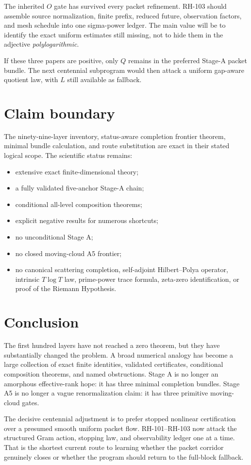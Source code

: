 \documentclass[11pt]{article}
\theoremstyle{definition}
\theoremstyle{remark}
\begin{document}
The inherited $O$ gate has survived every packet refinement.  RH-103 should
assemble source normalization, finite prefix, reduced future, observation
factors, and mesh schedule into one sigma-power ledger.  The main value will
be to identify the exact uniform estimates still missing, not to hide them in
the adjective \emph{polylogarithmic}.

If these three papers are positive, only $Q$ remains in the preferred
Stage-A packet bundle.  The next centennial subprogram would then attack a
uniform gap-aware quotient law, with $L$ still available as fallback.

\section{Claim boundary}

The ninety-nine-layer inventory, status-aware completion frontier theorem,
minimal bundle calculation, and route substitution are exact in their stated
logical scope.  The scientific status remains:
\begin{itemize}[leftmargin=2em]
\item extensive exact finite-dimensional theory;
\item a fully validated five-anchor Stage-A chain;
\item conditional all-level composition theorems;
\item explicit negative results for numerous shortcuts;
\item no unconditional Stage A;
\item no closed moving-cloud A5 frontier;
\item no canonical scattering completion, self-adjoint Hilbert--Polya
operator, intrinsic $T\log T$ law, prime-power trace formula, zeta-zero
identification, or proof of the Riemann Hypothesis.
\end{itemize}

\section{Conclusion}

The first hundred layers have not reached a zero theorem, but they have
substantially changed the problem.  A broad numerical analogy has become a
large collection of exact finite identities, validated certificates,
conditional composition theorems, and named obstructions.  Stage A is no
longer an amorphous effective-rank hope: it has three minimal completion
bundles.  Stage A5 is no longer a vague renormalization claim: it has three
primitive moving-cloud gates.

The decisive centennial adjustment is to prefer stopped nonlinear
certification over a presumed smooth uniform packet flow.  RH-101--RH-103 now
attack the structured Gram action, stopping law, and observability ledger one
at a time.  That is the shortest current route to learning whether the packet
corridor genuinely closes or whether the program should return to the
full-block fallback.



\end{document}
